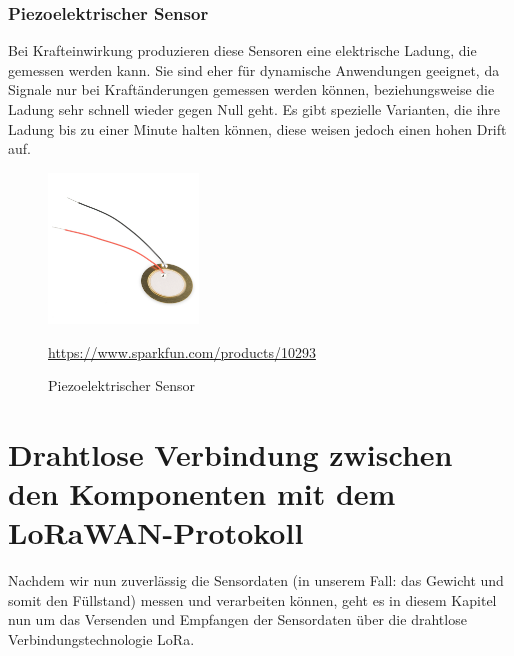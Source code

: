 \subsection{Piezoelektrischer Sensor}
Bei Krafteinwirkung produzieren diese Sensoren eine elektrische Ladung, die gemessen werden kann. Sie sind eher für dynamische Anwendungen geeignet, da Signale nur bei Kraftänderungen gemessen werden können, beziehungsweise die Ladung sehr schnell wieder gegen Null geht. Es gibt spezielle Varianten, die ihre Ladung bis zu einer Minute halten können, diese weisen jedoch einen hohen Drift auf. 
\begin{figure}[H]
    \center
    \includegraphics[width=4cm]{Bilder/waegezelle-ring.png}\\
    \caption{Piezoelektrischer Sensor}
    \begin{center} \quelle\url{https://www.sparkfun.com/products/10293} \end{center}
\end{figure}

\chapter{Drahtlose Verbindung zwischen den Komponenten mit dem LoRaWAN-Protokoll}
Nachdem wir nun zuverlässig die Sensordaten (in unserem Fall: das Gewicht und somit den Füllstand) messen und verarbeiten können, geht es in diesem Kapitel nun um das Versenden und Empfangen der Sensordaten über die drahtlose Verbindungstechnologie LoRa.
